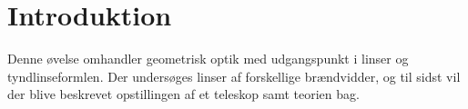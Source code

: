 \section{Introduktion}
Denne øvelse omhandler geometrisk optik med udgangspunkt i linser og tyndlinseformlen. Der undersøges linser af forskellige brændvidder, og til sidst vil der blive beskrevet opstillingen af et teleskop samt teorien bag. 


